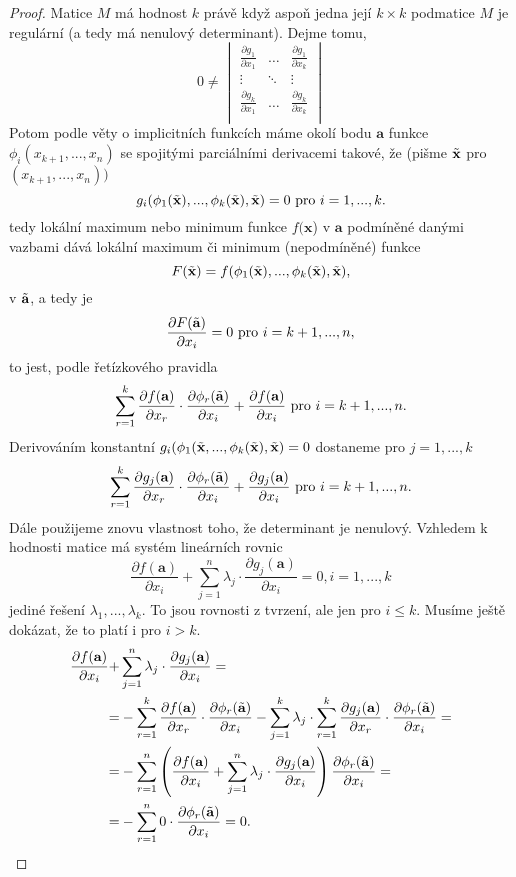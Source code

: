\documentclass[../main.tex]{subfiles}
\begin{document}
\begin{proof}
	Matice $M$ má hodnost $k$ právě když aspoň jedna její $k\times k$ podmatice $M$ je regulární (a tedy má nenulový determinant). Dejme tomu,
	\[ 0 \neq \begin{vmatrix}
	\frac{\partial g_1}{\partial x_1} & \dots & \frac{\partial g_1}{\partial x_k}\\
	\vdots & \ddots & \vdots\\
	\frac{\partial g_k}{\partial x_1} & \dots & \frac{\partial g_k}{\partial x_k}\\
	\end{vmatrix}\]
	Potom podle věty o implicitních funkcích máme okolí bodu $\textbf{a}$ funkce $\phi_i(x_{k+1},...,x_n)$
	se spojitými parciálními derivacemi takové, že (pišme $\Tilde{\textbf{x}}$ pro $(x_{k+1},...,x_n))$
	\[g_i(\phi_1(\Tilde{\textbf{x}}),...,\phi_k(\Tilde{\textbf{x}}),\Tilde{\textbf{x}}) = 0 \text{ pro } i=1,...,k.\]
	tedy lokální maximum nebo minimum funkce $f(\textbf{x}$) v $\textbf{a}$ podmíněné danými vazbami dává lokální maximum či minimum (nepodmíněné) funkce
	\[F(\Tilde{\textbf{x}}) = f(\phi_1(\Tilde{\textbf{x}}),...,\phi_k(\Tilde{\textbf{x}}),\Tilde{\textbf{x}}),\]
	v $\Tilde{\textbf{a}}$, a tedy je 
	\[\frac{\partial F(\Tilde{\textbf{a}})}{\partial x_i} = 0 \text{ pro } i = k+1,...,n,\]
	to jest, podle řetízkového pravidla
	\[\sum^k_{r=1}\frac{\partial f(\textbf{a})}{\partial x_r}\cdot \frac{\partial \phi_r(\Tilde{\textbf{a}})}{\partial x_i} + \frac{\partial f(\textbf{a})}{\partial x_i} \text{ pro } i = k+1,...,n.\]
	Derivováním konstantní $g_i(\phi_1(\Tilde{\textbf{x}},...,\phi_k(\Tilde{\textbf{x}}),\Tilde{\textbf{x}}) = 0$ dostaneme pro $j = 1,...,k$
	\[\sum^k_{r=1}\frac{\partial g_j(\textbf{a})}{\partial x_r}\cdot \frac{\partial \phi_r(\Tilde{\textbf{a}})}{\partial x_i} + \frac{\partial g_j(\textbf{a})}{\partial x_i} \text{ pro } i = k+1,...,n.\]
	Dále použijeme znovu vlastnost toho, že determinant je nenulový. Vzhledem k hodnosti matice má systém lineárních rovnic
	\[\frac{\partial f(\textbf{a})}{\partial x_i} + \sum^n_{j=1}\lambda_j\cdot\frac{\partial g_j(\textbf{a})}{\partial x_i} = 0, i = 1,...,k\]
	jediné řešení $\lambda_1,...,\lambda_k.$ To jsou rovnosti z tvrzení, ale jen pro $i \leq k$. Musíme ještě dokázat, že to platí i pro $i > k$. 
	\begin{align*}
	\frac{\partial f(\textbf{a})}{\partial x_i} + & \sum^n_{j=1}\lambda_j\cdot\frac{\partial g_j(\textbf{a})}{\partial x_i}=\\
	= & - \sum^k_{r=1} \frac{\partial f(\textbf{a})}{\partial x_r}\cdot\frac{\partial \phi_r(\Tilde{\textbf{a}})}{\partial x_i} -
	\sum^k_{j=1}\lambda_j\cdot\sum^k_{r=1}\frac{\partial g_j(\textbf{a})}{\partial x_r}\cdot\frac{\partial \phi_r(\Tilde{\textbf{a}})}{\partial x_i} =\\
	= & - \sum^n_{r=1}\left(\frac{\partial f(\textbf{a})}{\partial x_i}+\sum^n_{j=1}\lambda_j\cdot\frac{\partial g_j(\textbf{a})}{\partial x_i}\right)\frac{\partial \phi_r(\Tilde{\textbf{a}})}{\partial x_i}=\\
	= & - \sum^n_{r=1}0\cdot\frac{\partial \phi_r(\Tilde{\textbf{a}})}{\partial x_i}=0.
	\end{align*}
\end{proof}
\end{document}
